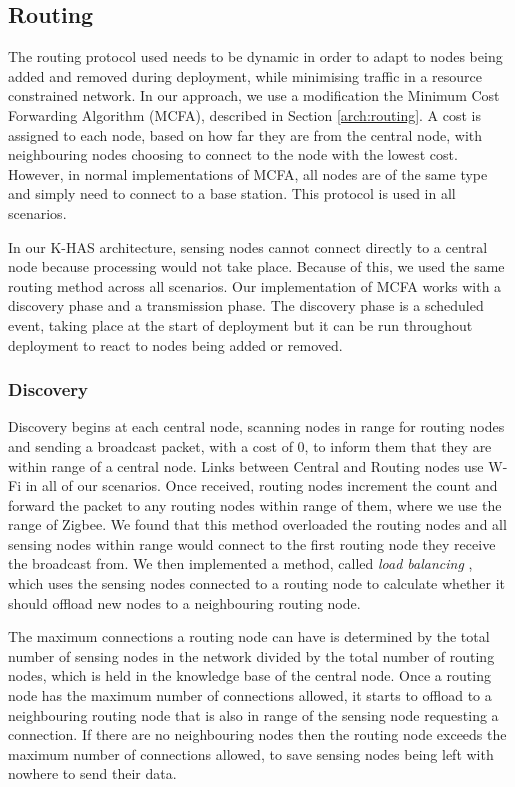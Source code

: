 \subsection{Routing}
The routing protocol used needs to be dynamic in order to adapt to nodes being added and removed during deployment, while minimising traffic in a resource constrained network. In our approach, we use a modification the Minimum Cost Forwarding Algorithm (MCFA), described in Section \ref{arch:routing}. A cost is assigned to each node, based on how far they are from the central node, with neighbouring nodes choosing to connect to the node with the lowest cost. However, in normal implementations of MCFA, all nodes are of the same type and simply need to connect to a base station. This protocol is used in all scenarios.

In our K-HAS architecture, sensing nodes cannot connect directly to a central node because processing would not take place. Because of this, we used the same routing method across all scenarios. Our implementation of MCFA works with a discovery phase and a transmission phase. The discovery phase is a scheduled event, taking place at the start of deployment but it can be run throughout deployment to react to nodes being added or removed. 

\subsubsection{Discovery}
	Discovery begins at each central node, scanning nodes in range for routing nodes and sending a broadcast packet, with a cost of 0, to inform them that they are within range of a central node. Links between Central and Routing nodes use W-Fi in all of our scenarios. Once received, routing nodes increment the count and forward the packet to any routing nodes within range of them, where we use the range of Zigbee. We found that this method overloaded the routing nodes and all sensing nodes within range would connect to the first routing node they receive the broadcast from. We then implemented a method, called \textit{load balancing} \cite{Gupta2003}, which uses the sensing nodes connected to a routing node to calculate whether it should offload new nodes to a neighbouring routing node.
	
	The maximum connections a routing node can have is determined by the total number of sensing nodes in the network divided by the total number of routing nodes, which is held in the knowledge base of the central node. Once a routing node has the maximum number of connections allowed, it starts to offload to a neighbouring routing node that is also in range of the sensing node requesting a connection. If there are no neighbouring nodes then the routing node exceeds the maximum number of connections allowed, to save sensing nodes being left with nowhere to send their data.
	
